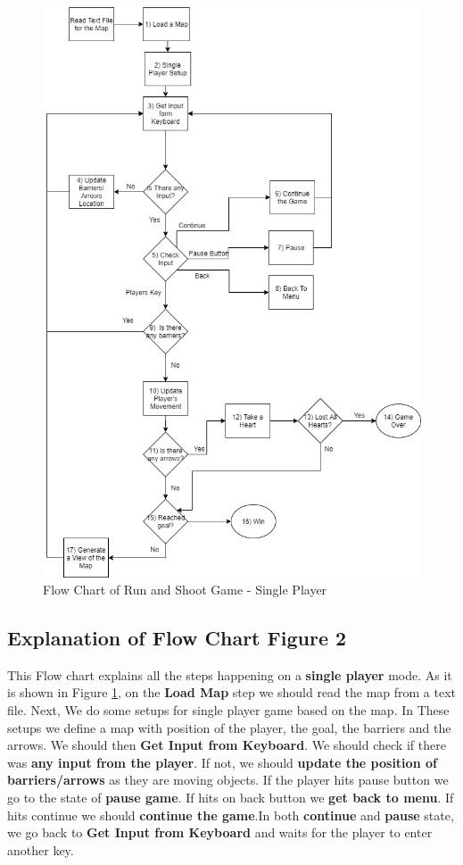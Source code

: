 
\begin{figure}
       
        \centering \includegraphics[width=0.9\columnwidth]{Run_and_shoot-Page-2}
        \caption{
        Flow Chart of Run and Shoot Game - Single Player}
        \label{fig:singleplayer}
\end{figure}

\subsection{Explanation of Flow Chart Figure 2}
This Flow chart explains all the steps happening on a \textbf{single player} mode. 
As it is shown in Figure \ref{fig:singleplayer}, on the \textbf{Load Map} step we should read the map from a text file. Next, We do some setups for single player game based on the map. In These setups we define a map with position of the player, the goal, the barriers and the arrows.
We should then \textbf{Get Input from Keyboard}. We should check if there was \textbf{any input from the player}. If not, we should \textbf{update the position of barriers/arrows} as they are moving objects. If the player hits pause button we go to the state of \textbf{pause game}. If hits on back button we \textbf{ get back to menu}. If hits continue we should \textbf{continue the game}.In both \textbf{continue} and \textbf{pause} state, we go back to \textbf{Get Input from Keyboard} and waits for the player to enter another key.


